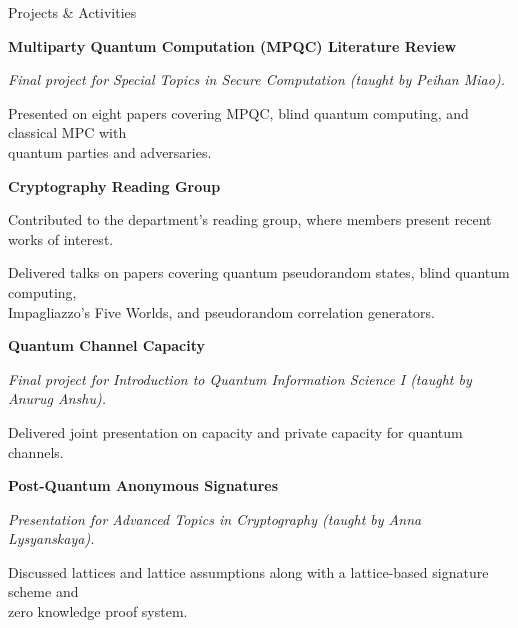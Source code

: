\documentclass{resume} %
\begin{document}
\begin{grouping}{Projects \& Activities}

\item {\bf Multiparty Quantum Computation (MPQC) Literature Review}
    \begin{items}
        \item {\em Final project for Special Topics in Secure Computation (taught by Peihan Miao).}
        \item Presented on eight papers covering MPQC, blind quantum computing, and classical MPC with \\
            quantum parties and adversaries.
    \end{items}

\item {\bf Cryptography Reading Group}
    \begin{items}
        \item Contributed to the department's reading group, where members present recent works of interest.
        \item Delivered talks on papers covering quantum pseudorandom states, blind quantum computing, \\
            Impagliazzo's Five Worlds, and pseudorandom correlation generators.
    \end{items}

\item {\bf Quantum Channel Capacity}
    \begin{items}
        \item {\em Final project for Introduction to Quantum Information Science I (taught by Anurug Anshu).}
        \item Delivered joint presentation on capacity and private capacity for quantum channels.
    \end{items}

\item {\bf Post-Quantum Anonymous Signatures}
    \begin{items}
        \item {\em Presentation for Advanced Topics in Cryptography (taught by Anna Lysyanskaya).}
        \item Discussed lattices and lattice assumptions along with a lattice-based signature scheme and \\
            zero knowledge proof system.
    \end{items}

\end{grouping}
\end{document}
